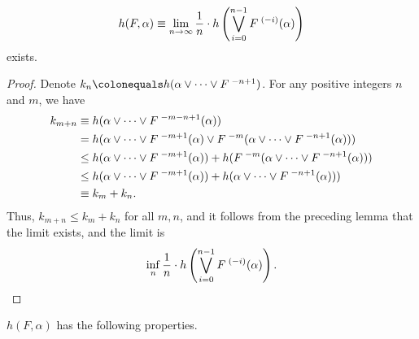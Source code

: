 \documentclass[10pt,twoside,draft]{book}
\begin{document}
\begin{proposition}
  \begin{equation*}
    h(F,\alpha) \equiv \lim\limits_{n \to \infty} \frac{1}{n} \cdot h\left (  \bigvee\limits_{i=0}^{n-1} F^{\;(-i)}(\alpha)  \right )
  \end{equation*}
  exists.
  \label{prop:entropy-limit}
  \begin{proof}
    Denote $k_n \ceq h(\alpha \vee \cdots \vee \itr{F}{-n+1})$.
    For any positive integers $n$ and $m$, we have
    \begin{align*}
      k_{m+n} &\equiv h(\alpha \vee \cdots \vee F^{\;-m-n+1}(\alpha))   \\
      &= h(\alpha \vee \cdots \vee F^{\;-m+1}(\alpha) \vee F^{\;-m}(\alpha \vee \cdots \vee F^{\;-n+1}(\alpha)))   \\
      &\leq  h(\alpha \vee \cdots \vee F^{\;-m+1}(\alpha)) + h(F^{\;-m}(\alpha \vee\cdots \vee F^{\;-n+1}(\alpha)))   \\
      &\leq  h(\alpha \vee \cdots \vee F^{\;-m+1}(\alpha)) + h(\alpha \vee \cdots \vee F^{\;-n+1}(\alpha)))   \\
      &\equiv k_m + k_n.
    \end{align*}
    Thus, $k_{m+n} \leq k_m + k_n$ for all $m,n$, and it follows from the preceding lemma that the limit exists, and the limit is
    \begin{equation*}
      \inf\limits_{n} \frac{1}{n} \cdot h\left (  \bigvee\limits_{i=0}^{n-1} F^{\;(-i)}(\alpha)  \right ).
    \end{equation*}
  \end{proof}
\end{proposition}
$h(F, \alpha)$ has the following properties.
\end{document}
